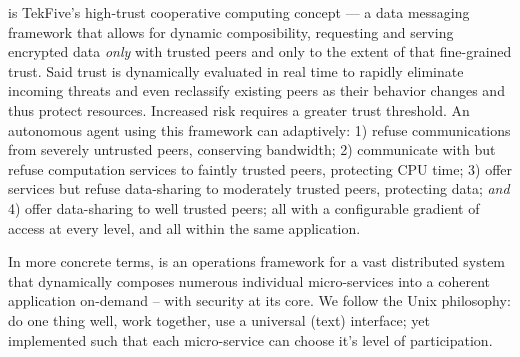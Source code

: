 \textbf{\projectName}is TekFive's high-trust cooperative computing concept --- a data messaging framework that allows for dynamic composibility, requesting and serving encrypted data \textit{only} with trusted peers and only to the extent of that fine-grained trust.
Said trust is dynamically evaluated in real time to rapidly eliminate incoming threats and even reclassify existing peers as their behavior changes and thus protect resources.
Increased risk requires a greater trust threshold.
An autonomous agent using this framework can adaptively: 1) refuse communications from severely untrusted peers, conserving bandwidth; 2) communicate with but refuse computation services to faintly trusted peers, protecting CPU time; 3) offer services but refuse data-sharing to moderately trusted peers, protecting data; \textit{and} 4) offer data-sharing to well trusted peers; all with a configurable gradient of access at every level, and all within the same application.

In more concrete terms, \projectName is an operations framework for a vast distributed system that dynamically composes numerous individual micro-services into a coherent application on-demand -- with security at its core.
We follow the Unix philosophy: do one thing well, work together, use a universal (text) interface; yet implemented such that each micro-service can choose it's level of participation.
